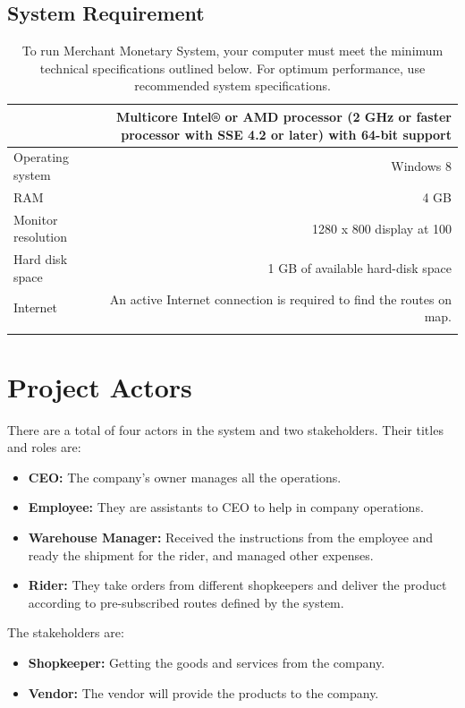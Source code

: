 \documentclass[12pt,a4paper]{article}
\begin{document}
\subsection{System Requirement}
\begin{longtable}{lr} 
 \caption{To run Merchant Monetary System, your computer must meet the minimum technical specifications outlined below. For optimum performance, use recommended system specifications.}\\
\begin{tabular}{ | m{4cm} | m{12cm}| } \hline
Processor & 
Multicore Intel® or AMD processor (2 GHz or faster processor with SSE 4.2 or later) with 64-bit support
 \\ \hline
Operating system & Windows 8
 \\ \hline
RAM & 4 GB
 \\ \hline
Monitor resolution & 1280 x 800 display at 100%
 \\ \hline
Hard disk space & 1 GB of available hard-disk space
 \\ \hline
Internet & 
An active Internet connection is required to find the routes on  map. 
  \\ \hline
\end{tabular}
\end{longtable}
\section{Project Actors}
There are a total of four actors in the system and two stakeholders. Their titles and roles are:
\begin{itemize}
\item \textbf{ CEO:} The company's owner manages all the operations.
\item \textbf{Employee:} They are assistants to CEO to help in company operations. 
\item \textbf{Warehouse Manager:} Received the instructions from the employee and ready the shipment for the rider, and managed other expenses.
\item \textbf{Rider:} They take orders from different shopkeepers and deliver the product according to pre-subscribed routes defined by the system.
\end{itemize}
The stakeholders are:
\begin{itemize}
\item \textbf{Shopkeeper:} Getting the goods and services from the company.
\item \textbf{Vendor:} The vendor will provide the products to the company. 
\end{itemize}
\end{document}
